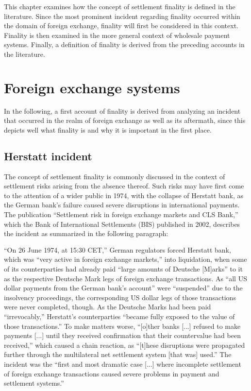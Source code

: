 This chapter examines how the concept of settlement finality is defined in the literature.
Since the most prominent incident regarding finality occurred within the domain of foreign exchange, finality will first be considered in this context.
Finality is then examined in the more general context of wholesale payment systems.
Finally, a definition of finality is derived from the preceding accounts in the literature.

\section{Foreign exchange systems}

In the following, a first account of finality is derived from analyzing an incident that occurred in the realm of foreign exchange as well as its aftermath, since this depicts well what finality is and why it is important in the first place.

\subsection{Herstatt incident}

The concept of settlement finality is commonly discussed in the context of settlement risks arising from the absence thereof.
Such risks may have first come to the attention of a wider public in 1974, with the collapse of Herstatt bank, as the German bank's failure caused severe disruptions in international payments.
The publication ``Settlement risk in foreign exchange markets and CLS Bank,'' \autocite[55, 56]{galati2002} which the Bank of International Settlements (BIS) published in 2002, describes the incident as summarized in the following paragraph:

``On 26 June 1974, at 15:30 CET,'' German regulators forced Herstatt bank, which was ``very active in foreign exchange markets,'' into liquidation, when some of its counterparties had already paid ``large amounts of Deutsche [M]arks'' to it as the respective Deutsche Mark legs of foreign exchange transactions.
As ``all US dollar payments from the German bank's account'' were ``suspended'' due to the insolvency proceedings, the corresponding US dollar legs of those transactions were never completed, though.
As the Deutsche Marks had been paid ``irrevocably,'' Herstatt's counterparties ``became fully exposed to the value of those transactions.''
To make matters worse, ``[o]ther banks [...] refused to make payments [...] until they received confirmation that their countervalue had been received,'' which caused a chain reaction, as ``[t]hese disruptions were propagated further through the multilateral net settlement system [that was] used.''
The incident was the ``first and most dramatic case [...] where incomplete settlement of foreign exchange transactions caused severe problems in payment and settlement systems.''

